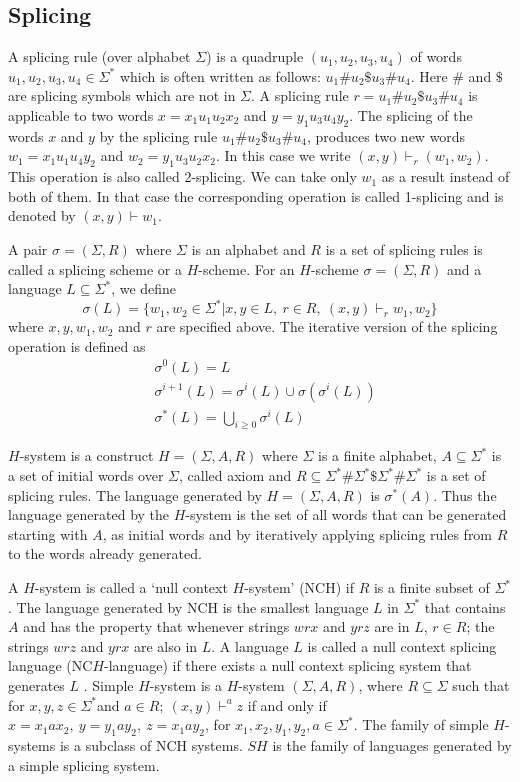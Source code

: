 \documentclass{llncs}
\newcommand{\sg}{\Sigma}
\newcommand{\h}{$H$}
\begin{document}
\subsection{Splicing}
\par A splicing rule (over alphabet $\sg$) is a quadruple $(u_1,u_2,u_3,u_4)$
of words $u_1,u_2,u_3,u_4\in\sg^*$  which is often written as
follows: $u_1\#u_2\$u_3\#u_4$. Here $\#$ and $\$$ are splicing
symbols which are not in $\sg$. A splicing rule
$r=u_1\#u_2\$u_3\#u_4$ is applicable to two words $x=x_1u_1u_2x_2$
and $y=y_1u_3u_4y_2$. The splicing of the words $x$ and $y$ by the
splicing rule $u_1\#u_2\$u_3\#u_4$, produces two new words
$w_1=x_1u_1u_4y_2$ and $w_2=y_1u_3u_2x_2$. In this case we write
$(x,y)\vdash_r(w_1,w_2)$. This operation is also called 2-splicing.
We can take only $w_1$ as a result instead of both of them. In that
case the corresponding operation is called 1-splicing and is denoted
by $(x,y)\vdash w_1$.

\par A pair $\sigma=(\sg,R)$ where $\sg$ is an alphabet and $R$ is a set of
splicing rules is called a splicing scheme or a $H$-scheme. For an $H$-scheme
$\sigma=(\sg,R)$ and a language $L\subseteq\sg^*$, we define
\[\sigma(L)=\{w_1,w_2\in\sg^*|x,y\in L,~r\in R,~ (x,y)\vdash_r w_1,w_2\}\]
where $x,y,w_1,w_2$ and $r$ are specified above. The iterative version of the
splicing operation is defined as
\begin{eqnarray*}
&\sigma^0(L)=L\\
&\sigma^{i+1}(L)=\sigma^i(L)\cup\sigma(\sigma^i(L))\\
&\sigma^*(L)=\bigcup_{i\geq0}\sigma^i(L)
\end{eqnarray*}

\par $H$-system is a construct $H=(\sg,A,R)$ where $\sg$ is a finite alphabet,
$A\subseteq \sg^*$  is a set of initial words over $\sg$, called
axiom and $R\subseteq \sg^*\#\sg^*\$\sg^*\#\sg^*$ is a set of
splicing rules. The language generated by   $H=(\sg,A,R)$ is
$\sigma^*(A)$. Thus the language generated by the $H$-system is the
set of all words that can be generated starting with $A$, as initial
words and by iteratively applying splicing rules from $R$ to the
words already generated.

\par A $H$-system is called a `null context \h-system' (NCH) if   $R$ is a
finite subset of $\sg^*$. The language generated by NCH is the
smallest language $L$ in $\sg^*$ that contains $A$ and has the
property that whenever strings $wrx$ and $yrz$ are in $L$, $r\in R$;
the strings $wrz$ and $yrx$ are also in $L$. A language $L$ is
called a null context splicing language (NC\h-language) if there
exists a null context splicing system that generates $L$
\cite{head}. Simple \h-system  \cite{MPS} is a \h-system
$(\sg,A,R)$, where $R\subseteq\sg$ such that for $x,y,z\in\sg^*$and
$a\in R;~(x,y)\vdash^az$ if and only if
$x=x_1ax_2,~y=y_1ay_2,~z=x_1ay_2$, for $x_1,x_2,y_1,y_2,a\in\sg^*$.
The family of simple \h-systems is a subclass of NCH systems. $SH$
is the family of languages generated by a simple splicing system.
\end{document}
